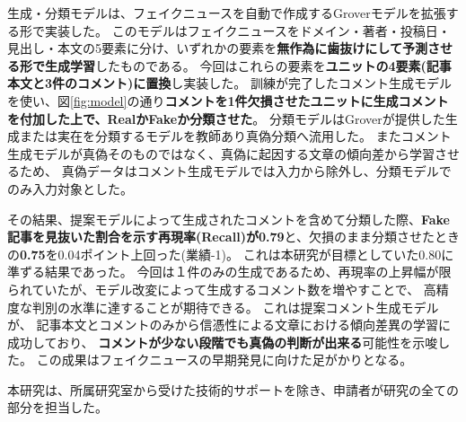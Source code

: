 {	生成・分類モデルは、フェイクニュースを自動で作成するGroverモデル\cite{NIPS2019_9106}を拡張する形で実装した。
	このモデルはフェイクニュースをドメイン・著者・投稿日・見出し・本文の5要素に分け、いずれかの要素を\textbf{無作為に歯抜けにして予測させる形で生成学習}したものである。
	今回はこれらの要素を\textbf{ユニットの4要素(記事本文と3件のコメント)に置換}し実装した。
	訓練が完了したコメント生成モデルを使い、図\ref{fig:model}の通り\textbf{コメントを1件欠損させたユニットに生成コメントを付加した上で、RealかFakeか分類させた}。
	分類モデルはGroverが提供した生成または実在を分類するモデルを教師あり真偽分類へ流用した。
	またコメント生成モデルが真偽そのものではなく、真偽に起因する文章の傾向差から学習させるため、
	真偽データはコメント生成モデルでは入力から除外し、分類モデルでのみ入力対象とした。

	その結果、提案モデルによって生成されたコメントを含めて分類した際、\textbf{Fake記事を見抜いた割合を示す再現率(Recall)が0.79}と、欠損のまま分類させたときの\textbf{0.75}を0.04ポイント上回った(業績-1)。
	これは本研究が目標としていた0.80に準ずる結果であった。
	今回は１件のみの⽣成であるため、再現率の上昇幅が限られていたが、モデル改変によって⽣成するコメント数を増やすことで、
	⾼精度な判別の⽔準に達することが期待できる。
	これは提案コメント生成モデルが、
	記事本文とコメントのみから信憑性による文章における傾向差異の学習に成功しており、
	\textbf{コメントが少ない段階でも真偽の判断が出来る}可能性を示唆した。
	この成果はフェイクニュースの早期発⾒に向けた足がかりとなる。

	本研究は、所属研究室から受けた技術的サポートを除き、申請者が研究の全ての部分を担当した。

}
